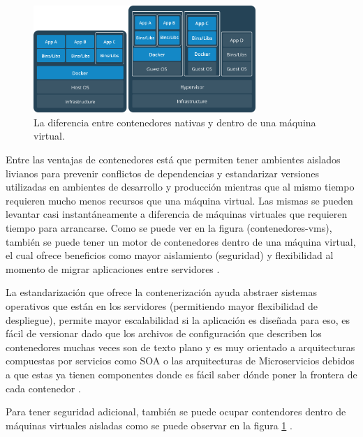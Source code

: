 \begin{figure}
  \begin{center}
      \includegraphics[width=0.75\textwidth]{Figures/contenedores-vms.png}
  \end{center}
  \caption{La diferencia entre contenedores nativas y dentro de una máquina virtual. \citep{Docker-Containers}}
  \label{contenedores-vms}
\end{figure}

 
Entre las ventajas de contenedores está que permiten tener ambientes aislados livianos para prevenir conflictos de dependencias y estandarizar versiones utilizadas en ambientes de desarrollo y producción mientras que al mismo tiempo requieren mucho menos recursos que una máquina virtual. Las mismas se pueden levantar casi instantáneamente a diferencia de máquinas virtuales que requieren tiempo para arrancarse. Como se puede ver en la figura (contenedores-vms), también se puede tener un motor de contenedores dentro de una máquina virtual, el cual ofrece beneficios como mayor aislamiento (seguridad) y flexibilidad al momento de migrar aplicaciones entre servidores \citep{Docker-Containers}.

La estandarización que ofrece la contenerización ayuda abstraer sistemas operativos que están en los servidores (permitiendo mayor flexibilidad de despliegue),  permite mayor escalabilidad si la aplicación es diseñada para eso, es fácil de versionar dado que los archivos de configuración que describen los contenedores muchas veces son de texto plano y es muy orientado a arquitecturas compuestas por servicios como SOA o las arquitecturas de Microservicios debidos a que estas ya tienen componentes donde es fácil saber dónde poner la frontera de cada contenedor \citep{DigitalOcean-Docker-Ecosystem}.

Para tener seguridad adicional, también se puede ocupar contendores dentro de máquinas virtuales aisladas como se puede observar en la figura \ref{contenedores-vms} \citep{Docker-Containers}.

